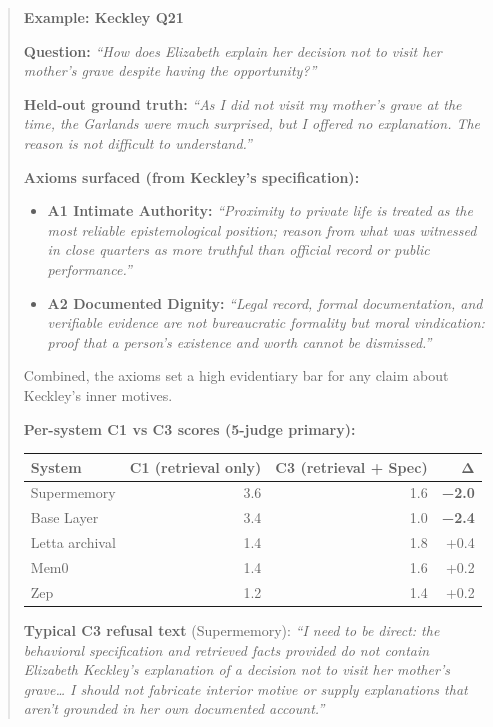 \begin{quote}
\textbf{Example: Keckley Q21}

\textbf{Question:} \emph{``How does Elizabeth explain her decision not
to visit her mother's grave despite having the opportunity?''}

\textbf{Held-out ground truth:} \emph{``As I did not visit my mother's
grave at the time, the Garlands were much surprised, but I offered no
explanation. The reason is not difficult to understand.''}

\textbf{Axioms surfaced (from Keckley's specification):}

\begin{itemize}
\tightlist
\item
  \textbf{A1 Intimate Authority:} \emph{``Proximity to private life is
  treated as the most reliable epistemological position; reason from
  what was witnessed in close quarters as more truthful than official
  record or public performance.''}
\item
  \textbf{A2 Documented Dignity:} \emph{``Legal record, formal
  documentation, and verifiable evidence are not bureaucratic formality
  but moral vindication: proof that a person's existence and worth
  cannot be dismissed.''}
\end{itemize}

Combined, the axioms set a high evidentiary bar for any claim about
Keckley's inner motives.

\textbf{Per-system C1 vs C3 scores (5-judge primary):}

\begin{longtable}[]{@{}lrrr@{}}
\toprule
System & C1 (retrieval only) & C3 (retrieval + Spec) & Δ \\
\midrule
\endhead
Supermemory & 3.6 & 1.6 & \textbf{−2.0} \\
Base Layer & 3.4 & 1.0 & \textbf{−2.4} \\
Letta archival & 1.4 & 1.8 & +0.4 \\
Mem0 & 1.4 & 1.6 & +0.2 \\
Zep & 1.2 & 1.4 & +0.2 \\
\bottomrule
\end{longtable}

\textbf{Typical C3 refusal text} (Supermemory): \emph{``I need to be
direct: the behavioral specification and retrieved facts provided do not
contain Elizabeth Keckley's explanation of a decision not to visit her
mother's grave\ldots{} I should not fabricate interior motive or supply
explanations that aren't grounded in her own documented account.''}


\end{quote}
